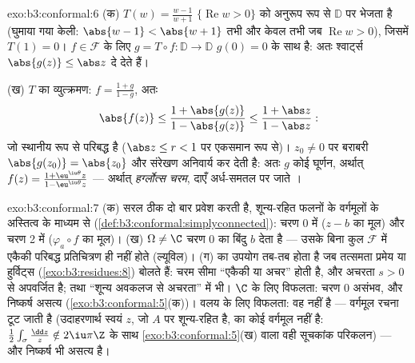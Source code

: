 \begin{solution}{exo:b3:conformal:6}
(क) $T(w) = \frac{w - 1}{w + 1}$ $\{\operatorname{Re}w >
0\}$ को अनुरूप रूप से $\mathbb D$ पर भेजता है (घुमाया गया केली:
$\abs{w -
1} < \abs{w + 1}$ तभी और केवल तभी जब $\operatorname{Re}w > 0$), जिसमें $T(1) =
0$। $f \in \mathcal F$ के लिए $g = T\circ f\colon \mathbb D \to
\mathbb D$
$g(0) = 0$ के साथ  है: अतः श्वार्ट्स $\abs{g(z)} \leq \abs z$ दे देते हैं।

(ख) $T$ का व्युत्क्रमण: $f = \frac{1 + g}{1 - g}$, अतः
\[
\abs{f(z)} \leq \frac{1 + \abs{g(z)}}{1 - \abs{g(z)}}
\leq \frac{1 + \abs z}{1 - \abs z} :
\]
जो स्थानीय रूप से परिबद्ध है ($\abs z \leq r < 1$ पर एकसमान रूप से)। $z_0 \neq 0$ पर
बराबरी $\abs{g(z_0)} = \abs{z_0}$ और संरेखण अनिवार्य कर देती है: अतः $g$ कोई घूर्णन,
अर्थात् $f(z) = \frac{1 +
\eu^{\iu\theta}z}{1 - \eu^{\iu\theta}z}$ --- अर्थात् \emph{हर्ग्लोत्स चरम}, दाएँ अर्ध-समतल पर
जाते ।
\end{solution}

\begin{solution}{exo:b3:conformal:7}
(क) सरल  ठीक दो बार प्रवेश करती है, शून्य-रहित फलनों के
 वर्गमूलों के अस्तित्व के माध्यम से (\cref{def:b3:conformal:simplyconnected}): चरण 0 में
($z - b$ का मूल) और चरण 2 में ($\varphi_a\circ f$ का मूल)। (ख) $\Omega \neq \C$ चरण 0 का बिंदु
$b$ देता है --- उसके बिना कुल $\mathcal F$ में एकैकी परिबद्ध प्रतिचित्रण
ही नहीं होते (ल्यूविल)। (ग)  का उपयोग तब-तब होता है जब
तत्समता प्रमेय या हुर्विट्स (\cref{exo:b3:residues:8}) बोलते हैं: चरम सीमा ``एकैकी या
अचर'' होती है, और अचरता $s > 0$ से अपवर्जित है; तथा ``शून्य अवकलज से
अचरता'' में भी। $\C$ के लिए विफलता: चरण 0 असंभव, और निष्कर्ष असत्य
(\cref{exo:b3:conformal:5}(क))। वलय के लिए विफलता: वह  नहीं है --- वर्गमूल
रचना टूट जाती है (उदाहरणार्थ स्वयं $z$, जो $A$ पर शून्य-रहित है,
का कोई  वर्गमूल नहीं है: $\frac12\int_\sigma\frac{\dd z}z \notin 2\iu\pi\Z$ के साथ \cref{exo:b3:conformal:5}(ख) वाला वही
सूचकांक परिकलन) --- और निष्कर्ष भी असत्य है।
\end{solution}

